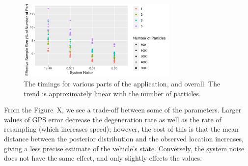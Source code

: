 \begin{figure}[tb]
    \centering
    \includegraphics[width=0.7\textwidth]{figures/04_model_results_neff.pdf}
    \caption{The timings for various parts of the application, and overall. %
        The trend is approximately linear with the number of particles.}
    \label{fig:neff}
\end{figure}




From the Figure~X, 
we see a trade-off between some of the parameters.
Larger values of GPS error decrease the degeneration rate
as well as the rate of resampling (which increases speed);
however, the cost of this is that the mean distance between the posterior distribution
and the observed location increases, giving a less precise estimate of the vehicle's state.
Conversely, the system noise does not have the same effect,
and only slightly effects the values.








